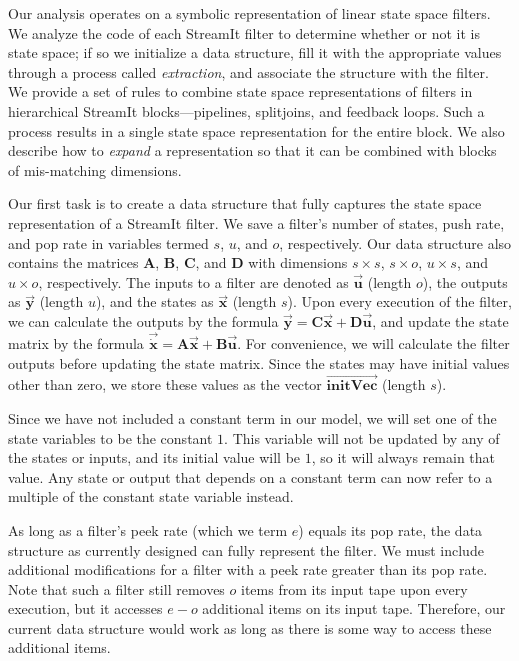 \label{sec:statespace}

Our analysis operates on a symbolic representation of linear state
space filters.  We analyze the code of each StreamIt filter to
determine whether or not it is state space; if so we initialize a data
structure, fill it with the appropriate values through a process
called \emph{extraction}, and associate the structure with the filter.
We provide a set of rules to combine state space representations of
filters in hierarchical StreamIt blocks---pipelines, splitjoins, and
feedback loops. Such a process results in a single state space
representation for the entire block.  We also describe how to
\emph{expand} a representation so that it can be combined with blocks
of mis-matching dimensions.


Our first task is to create a data structure that fully captures the
state space representation of a StreamIt filter.  We save a filter's
number of states, push rate, and pop rate in variables termed $s$,
$u$, and $o$, respectively. Our data structure also contains the
matrices $\mathbf{A}$, $\mathbf{B}$, $\mathbf{C}$, and $\mathbf{D}$
with dimensions $s \times s$, $s
\times o$, $u \times s$, and $u \times o$, respectively. The
inputs to a filter are denoted as $\vec{\mathbf{u}}$ (length $o$), the
outputs as $\vec{\mathbf{y}}$ (length $u$), and the states as
$\vec{\mathbf{x}}$ (length $s$). Upon every execution of the filter,
we can calculate the outputs by the formula $\vec{\mathbf{y}} =
\mathbf{C}\vec{\mathbf{x}} +
\mathbf{D}\vec{\mathbf{u}}$, and update the state matrix by the
formula $\vec{\dot{\mathbf{x}}} = \mathbf{A}\vec{\mathbf{x}} +
\mathbf{B}\vec{\mathbf{u}}$. For convenience, we will calculate
the filter outputs before updating the state matrix. Since the
states may have initial values other than zero, we store these
values as the vector $\overrightarrow{\mathbf{initVec}}$ (length
$s$).

Since we have not included a constant term in our model, we will set
one of the state variables to be the constant $1$. This variable will
not be updated by any of the states or inputs, and its initial value
will be $1$, so it will always remain that value. Any state or output
that depends on a constant term can now refer to a multiple of the
constant state variable instead.

As long as a filter's peek rate (which we term $e$) equals its pop
rate, the data structure as currently designed can fully represent the
filter. We must include additional modifications for a filter with a
peek rate greater than its pop rate. Note that such a filter still
removes $o$ items from its input tape upon every execution, but it
accesses $e-o$ additional items on its input tape. Therefore, our
current data structure would work as long as there is some way to
access these additional items.

